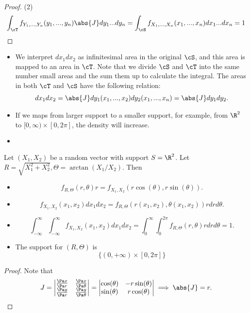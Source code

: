 \begin{refsection}
\begin{proof}
(2)
$$\int_{\cT} f_{Y_1,...,Y_n}(y_1,...,y_n)\abs{J}dy_1 ... dy_n = \int_{\cS} f_{X_1,...,X_n}(x_1,...,x_n)dx_1 ... dx_n = 1$$

\end{proof}


\begin{remark}\hfill
\begin{itemize}
	\item We interpret $dx_1dx_2$ as infinitesimal area in the original $\cS$, and this area is mapped to an area in $\cT$. Note that we divide $\cS$ and $\cT$ into the same number small areas and the sum them up to calculate the integral. The areas in both $\cT$ and $\cS$ have the following relation: 
	$$dx_1dx_2 = \abs{J} dy_1(x_1,...,x_2)dy_2(x_1,...,x_n) = \abs{J} dy_1dy_2.$$
	\item If we maps from larger support to a smaller support, for example, from $\R^2$ to $[0,\infty)\times [0,2\pi]$, the density will increase.
	\item 
\end{itemize}	
\end{remark}


\begin{lemma}\label{ch:theory-of-probability:th:RandomVectorPolarTransformation}
Let $(X_1,X_2)$ be a random vector with support $S = \R^2$. Let $R = \sqrt{X_1^2 + X_2^2}, \Theta = \arctan (X_1/X_2)$. Then
\begin{itemize}
	\item $$f_{R,\Theta}(r,\theta)r = f_{X_1,X_2}(r\cos(\theta),r\sin(\theta)) .$$
	\item 
	$$f_{X_1,X_2}(x_1,x_2) dx_1dx_2 =  f_{R,\Theta}(r(x_1,x_2),\theta(x_1,x_2)) rdrd\theta .$$
\item 
$$\int_{-\infty}^{\infty}\int_{-\infty}^{\infty} f_{X_1,X_2}(x_1,x_2) dx_1dx_2 = \int_{0}^{\infty}\int_{0}^{2\pi} f_{R,\Theta}(r,\theta) rdrd\theta = 1.$$
	\item The support for $(R,\Theta)$ is
	$$\{(0,+\infty)\times [0,2\pi] \}$$
\end{itemize}
\end{lemma}

\begin{proof}
	
Note that
$$J=\begin{vmatrix}
\frac{\Pa x}{\Pa r} & \frac{\Pa x}{\Pa \theta} \\
\frac{\Pa y}{\Pa r} & \frac{\Pa y}{\Pa \theta}
\end{vmatrix} = \begin{vmatrix}
\cos(\theta) & -r\sin(\theta) \\
\sin(\theta) &  r\cos(\theta)
\end{vmatrix}
\implies \abs{J} = r.$$


\end{proof}
\end{refsection}
